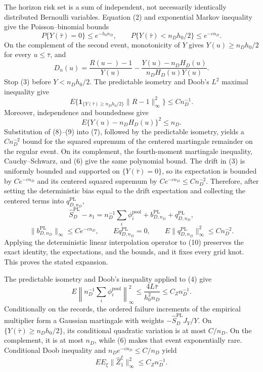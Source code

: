 The horizon risk set is a sum of independent, not necessarily identically distributed Bernoulli variables. Equation (2) and exponential Markov inequality give the Poisson--binomial bounds
\[
 P\{Y(\bar\tau)=0\}\le e^{-h_0n_D},
 \qquad
 P\{Y(\bar\tau)<n_Dh_0/2\}\le e^{-cn_D}.              \tag{6}
\]
On the complement of the second event, monotonicity of \(Y\) gives \(Y(u)\ge n_Dh_0/2\) for every \(u\le\bar\tau\), and
\[
 D_n(u)=\frac{R(u-)-1}{Y(u)}
 -\frac{Y(u)-n_DH_D(u)}{n_DH_D(u)Y(u)}.                 \tag{7}
\]
Stop (3) before \(Y<n_Dh_0/2\). The predictable isometry and Doob's \(L^2\) maximal inequality give
\[
 E\{\mathbf1_{\{Y(\bar\tau)\ge n_Dh_0/2\}}
 \|R-1\|_\infty^2\}\le Cn_D^{-1}.                     \tag{8}
\]
Moreover, independence and boundedness give
\[
 E\{Y(u)-n_DH_D(u)\}^2\le n_D.                         \tag{9}
\]
Substitution of (8)--(9) into (7), followed by the predictable isometry, yields a \(Cn_D^{-2}\) bound for the squared supremum of the centered martingale remainder on the regular event. On its complement, the fourth-moment martingale inequality, Cauchy--Schwarz, and (6) give the same polynomial bound. The drift in (3) is uniformly bounded and supported on \(\{Y(\bar\tau)=0\}\), so its expectation is bounded by \(Ce^{-cn_D}\) and its centered squared supremum by \(Ce^{-cn_D}\le Cn_D^{-2}\). Therefore, after setting the deterministic bias equal to the drift expectation and collecting the centered terms into \(q_{D,n_D}^{\mathrm{PL}}\),
\[
 \widehat S_D^{\mathrm{PL}}-s_1
 =n_D^{-1}\sum_i\phi_i^{\mathrm{pool}}
  +b_{D,n_D}^{\mathrm{PL}}+q_{D,n_D}^{\mathrm{PL}},      \tag{10}
\]
\[
 \|b_{D,n_D}^{\mathrm{PL}}\|_\infty\le Ce^{-cn_D},
 \qquad Eq_{D,n_D}^{\mathrm{PL}}=0,
 \qquad E\|q_{D,n_D}^{\mathrm{PL}}\|_\infty^2\le Cn_D^{-2}. \tag{11}
\]
Applying the deterministic linear interpolation operator to (10) preserves the exact identity, the expectations, and the bounds, and it fixes every grid knot. This proves the stated expansion.

The predictable isometry and Doob's inequality applied to (4) give
\[
 E\left\|n_D^{-1}\sum_i\phi_i^{\mathrm{pool}}\right\|_\infty^2
 \le \frac{4L\bar\tau}{h_0^2n_D}
 \le C_Zn_D^{-1}.                                       \tag{12}
\]
Conditionally on the records, the ordered failure increments of the empirical multiplier form a Gaussian martingale with weights \(-\widehat S_D^{\mathrm{PL}}J_Y/Y\). On \(\{Y(\bar\tau)\ge n_Dh_0/2\}\), its conditional quadratic variation is at most \(C/n_D\). On the complement, it is at most \(n_D\), while (6) makes that event exponentially rare. Conditional Doob inequality and \(n_De^{-cn_D}\le C/n_D\) yield
\[
 E E_\xi\|\widehat Z_1^\xi\|_\infty^2
 \le C_Zn_D^{-1}.                                       \tag{13}
\]

